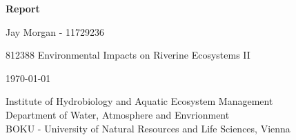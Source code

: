 \begin{titlepage}


\begin{center}                                          %
    \vspace*{3cm}                                           %

    \LARGE                                                  %
    \textbf{{Report}}

    \vspace{0.5cm}                                          %

    \vspace{1.5cm}                                          %

    \Large                                                  %
    Jay Morgan - 11729236\\
    \vspace{3cm}                                            %

    812388 Environmental Impacts on Riverine Ecosystems II
    \vspace{.5cm}                                           %

    \today                                                  %
    \vfill                                                  %

    \end{center}                                            %

    \normalsize                                             %
    Institute of Hydrobiology and Aquatic Ecosystem Management\\
    Department of Water, Atmosphere and Envrionment\\
    BOKU - University of Natural Resources and Life Sciences, Vienna\\





\end{titlepage}

